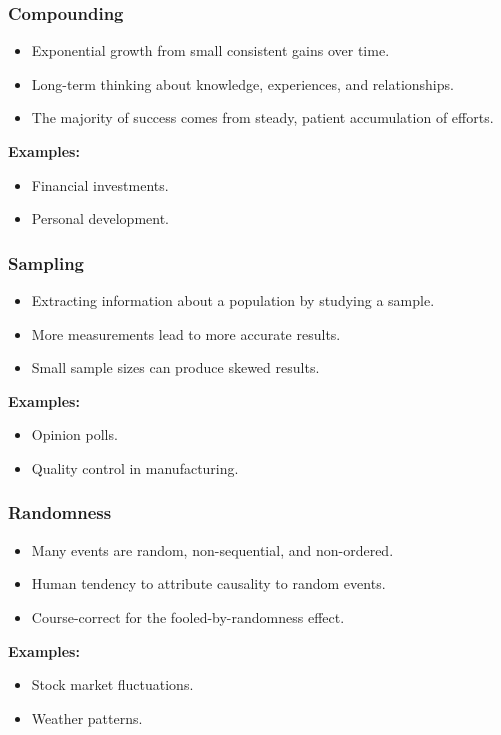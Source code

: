 \begin{frame}[fragile]\frametitle{Compounding}
\begin{itemize}
    \item Exponential growth from small consistent gains over time.
    \item Long-term thinking about knowledge, experiences, and relationships.
    \item The majority of success comes from steady, patient accumulation of efforts.
\end{itemize}
\textbf{Examples:}
\begin{itemize}
    \item Financial investments.
    \item Personal development.
\end{itemize}
\end{frame}

\begin{frame}[fragile]\frametitle{Sampling}
\begin{itemize}
    \item Extracting information about a population by studying a sample.
    \item More measurements lead to more accurate results.
    \item Small sample sizes can produce skewed results.
\end{itemize}
\textbf{Examples:}
\begin{itemize}
    \item Opinion polls.
    \item Quality control in manufacturing.
\end{itemize}
\end{frame}

\begin{frame}[fragile]\frametitle{Randomness}
\begin{itemize}
    \item Many events are random, non-sequential, and non-ordered.
    \item Human tendency to attribute causality to random events.
    \item Course-correct for the fooled-by-randomness effect.
\end{itemize}
\textbf{Examples:}
\begin{itemize}
    \item Stock market fluctuations.
    \item Weather patterns.
\end{itemize}
\end{frame}

